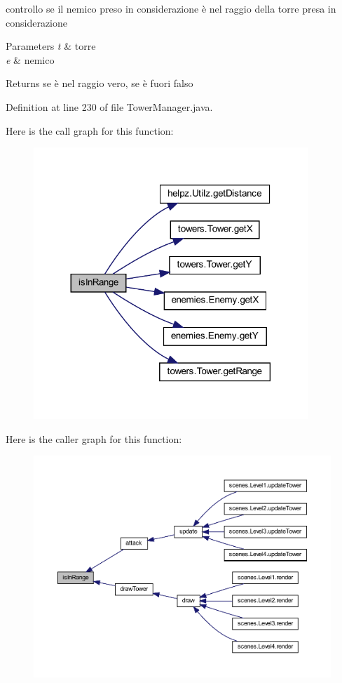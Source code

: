 controllo se il nemico preso in considerazione è nel raggio della torre presa in considerazione 


\begin{DoxyParams}{Parameters}
{\em t} & torre \\
\hline
{\em e} & nemico\\
\hline
\end{DoxyParams}
\begin{DoxyReturn}{Returns}
se è nel raggio vero, se è fuori falso 
\end{DoxyReturn}


Definition at line 230 of file Tower\+Manager.\+java.

Here is the call graph for this function\+:\nopagebreak
\begin{figure}[H]
\begin{center}
\leavevmode
\includegraphics[width=293pt]{classmanagers_1_1_tower_manager_a5f1dea7776d18a6f69428e43c4845fdb_cgraph}
\end{center}
\end{figure}
Here is the caller graph for this function\+:
\nopagebreak
\begin{figure}[H]
\begin{center}
\leavevmode
\includegraphics[width=350pt]{classmanagers_1_1_tower_manager_a5f1dea7776d18a6f69428e43c4845fdb_icgraph}
\end{center}
\end{figure}
